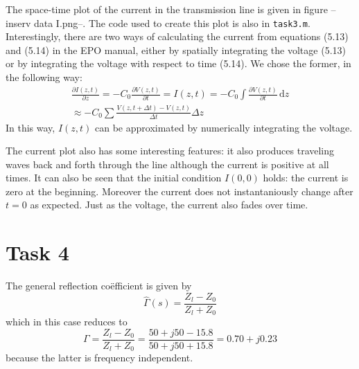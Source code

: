\documentclass[11pt,titlepage]{report}
\begin{document}
The space-time plot of the current in the transmission line is given in figure --inserv data I.png--. The code used to create this plot is also in \texttt{task3.m}. Interestingly, there are two ways of calculating the current from equations (5.13) and (5.14) in the EPO manual, either by spatially integrating the voltage (5.13) or by integrating the voltage with respect to time (5.14). We chose the former, in the following way:
\begin{eqnarray}
\frac{\partial I(z,t)}{\partial z}=-C_0\frac{\partial V(z,t)}{\partial t} = I(z,t)=-C_0\int \! \frac{\partial V(z,t)}{\partial t}\, \mathrm{d}z \\
\approx -C_0\sum\frac{V(z,t+\Delta t)-V(z,t)}{\Delta t}\Delta z
\end{eqnarray}
In this way, $I(z,t)$ can be approximated by numerically integrating the voltage. 

The current plot also has some interesting features: it also produces traveling waves back and forth through the line although the current is positive at all times. It can also be seen that the initial condition $I(0,0)$ holds: the current is zero at the beginning. Moreover the current does not instantaniously change after $t=0$ as expected. Just as the voltage, the current also fades over time.

\section{Task 4}
The general reflection co\"efficient is given by 
\begin{equation}
\hat{\Gamma}(s)=\frac{Z_l-Z_0}{Z_l+Z_0}
\end{equation}
which in this case reduces to
\begin{equation}
\Gamma = \frac{Z_l-Z_0}{Z_l+Z_0}=\frac{50+j50-15.8}{50+j50+15.8}=0.70+j0.23
\end{equation}
because the latter is frequency independent.
\end{document}
